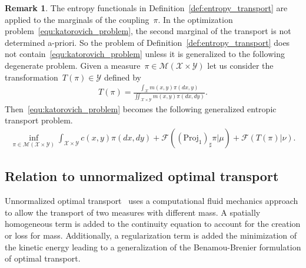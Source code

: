 \documentclass{article}
\theoremstyle{definition}
\newtheorem{remark}[theorem]{Remark}
\begin{document}
\begin{remark}
  The entropy functionals in Definition~\ref{def:entropy_transport} are applied to the marginals of the coupling~$\pi$. In the optimization problem~\eqref{equ:katorovich_problem}, the second marginal of the transport is not determined a-priori. So the problem of Definition~\ref{def:entropy_transport} does not contain~\eqref{equ:katorovich_problem} unless it is generalized to the following degenerate problem. Given a measure~$\pi \in \mathcal{M} (\mathcal{X} \times \mathcal{Y})$ let us consider the transformation~$T (\pi) \in \mathcal{Y}$ defined by 
  \begin{align}
      T(\pi) = \frac{\int_{\mathcal{X}} m(x,y) \pi(dx,y)}{\iint_{\mathcal{X} \times \mathcal{Y}} m(x,y) \pi(dx,dy)}.
  \end{align}
  Then~\eqref{equ:katorovich_problem} becomes the following generalized entropic transport problem.
    \begin{align*}
        \inf_{\pi \in \mathcal{M} (\mathcal{X} \times \mathcal{Y})}  \int_{\mathcal{X} \times \mathcal{Y}} c(x,y) \pi(dx, dy) + \mathcal{F}((\mbox{Proj}_1)_\sharp \pi|\mu) +  \mathcal{F}(T(\pi)|\nu) .
    \end{align*}  
\end{remark}

\subsection{Relation to unnormalized optimal transport}\label{sec:unnormalized_optimal_transport}

Unnormalized optimal transport~\cite{gangbo2019unnormalized} uses a computational fluid mechanics approach to allow the transport of two measures with different mass. A spatially homogeneous term is added to the continuity equation to account for the creation or loss for mass. Additionally, a regularization term is added the minimization of the kinetic energy leading to a generalization of the Benamou-Brenier formulation of optimal transport.
\end{document}
